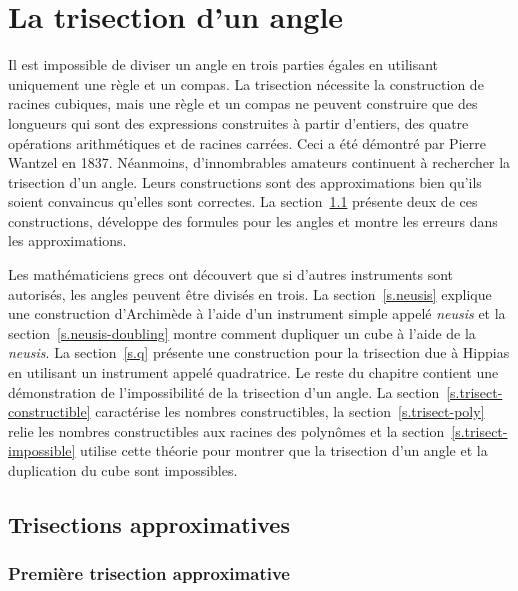 \chapter{La trisection d'un angle}\label{c.trisect}




Il est impossible de diviser un angle en trois parties égales en utilisant uniquement une règle et un compas. La trisection nécessite la construction de racines cubiques, mais une règle et un compas ne peuvent construire que des longueurs qui sont des expressions construites à partir d'entiers, des quatre opérations  arithmétiques et de racines carrées. Ceci a été démontré par Pierre Wantzel en 1837. Néanmoins, d'innombrables amateurs continuent à rechercher la  trisection d'un angle. Leurs constructions sont des approximations bien qu'ils soient convaincus qu'elles sont correctes. La section~\ref{s.trisect-approx} présente deux de ces constructions, développe des formules pour les angles et montre les erreurs dans les approximations.

Les mathématiciens grecs ont découvert que si d'autres instruments sont autorisés, les angles peuvent être divisés en trois. La section~\ref{s.neusis} explique une construction d'Archimède à l'aide d'un instrument simple appelé \emph{neusis} et la section~\ref{s.neusis-doubling} montre comment dupliquer un cube à l'aide de la \emph{neusis}. La section~\ref{s.q} présente une construction pour la trisection due à Hippias en utilisant un instrument appelé \og quadratrice\fg. Le reste du chapitre contient une démonstration de l'impossibilité de la trisection d'un angle. La section~\ref{s.trisect-constructible} caractérise les nombres constructibles, la section~\ref{s.trisect-poly} relie les nombres constructibles aux racines des polynômes et la section~\ref{s.trisect-impossible} utilise cette théorie pour montrer que la trisection d'un angle et la duplication du cube sont impossibles.


\section{Trisections approximatives}\label{s.trisect-approx}

\subsection{Première trisection approximative}\label{sub.trisect-approx1}

